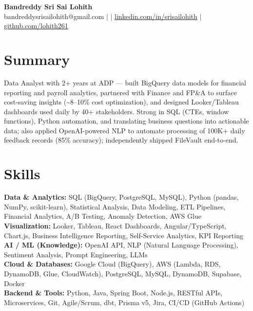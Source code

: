 \documentclass[10pt,letterpaper]{article}
\newcommand{\skillrow}[2]{\textbf{#1:} #2 \\[1pt]}
\begin{document}
\begin{center}
  {\Huge\bfseries Bandreddy Sri Sai Lohith}\\[3pt]
  \small bandreddysrisailohith@gmail.com $\vert$ $\vert$\; \href{https://linkedin.com/in/srisailohith}{linkedin.com/in/srisailohith} $\vert$\; \href{https://github.com/lohith261}{github.com/lohith261}
\end{center}

\section{Summary}

Data Analyst with 2+ years at ADP --- built BigQuery data models for financial reporting and payroll analytics, partnered with Finance and FP\&A to surface cost-saving insights (\textasciitilde{}8--10\% cost optimization), and designed Looker/Tableau dashboards used daily by 40+ stakeholders.
      Strong in SQL (CTEs, window functions), Python automation, and translating business questions into actionable data; also applied OpenAI-powered NLP to automate processing of 100K+ daily feedback records (85\% accuracy); independently shipped FileVault end-to-end.

\section{Skills}

\skillrow{Data \& Analytics}{SQL (BigQuery, PostgreSQL, MySQL), Python (pandas, NumPy, scikit-learn), Statistical Analysis, Data Modeling, ETL Pipelines, Financial Analytics, A/B Testing, Anomaly Detection, AWS Glue}
\skillrow{Visualization}{Looker, Tableau, React Dashboards, Angular/TypeScript, Chart.js, Business Intelligence Reporting, Self-Service Analytics, KPI Reporting}
\skillrow{AI / ML (Knowledge)}{OpenAI API, NLP (Natural Language Processing), Sentiment Analysis, Prompt Engineering, LLMs}
\skillrow{Cloud \& Databases}{Google Cloud (BigQuery), AWS (Lambda, RDS, DynamoDB, Glue, CloudWatch), PostgreSQL, MySQL, DynamoDB, Supabase, Docker}
\skillrow{Backend \& Tools}{Python, Java, Spring Boot, Node.js, RESTful APIs, Microservices, Git, Agile/Scrum, dbt, Prisma v5, Jira, CI/CD (GitHub Actions)}

\end{document}

